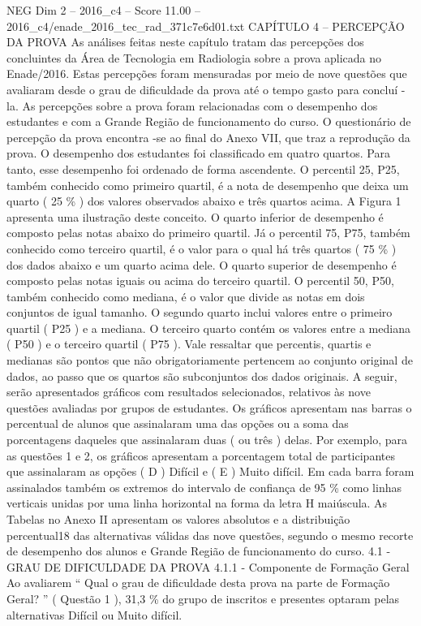 \begin{textsample}{NEG Dim 2 – 2016\_c4 – Score 11.00 – 2016\_c4/enade\_2016\_tec\_rad\_371c7e6d01.txt}  \label{ex:f2_neg_360}
CAPÍTULO 4 – PERCEPÇÃO DA PROVA As análises feitas neste capítulo tratam das percepções dos concluintes da Área de Tecnologia em Radiologia sobre a prova aplicada no Enade/2016.
Estas percepções foram mensuradas por meio de nove questões que avaliaram desde o grau de dificuldade da prova até o tempo gasto para concluí -la.
As percepções sobre a prova foram relacionadas com o desempenho dos estudantes e com a Grande Região de funcionamento do curso.
O questionário de percepção da prova encontra -se ao final do Anexo VII, que traz a reprodução da prova.
O desempenho dos estudantes foi classificado em quatro quartos.
Para tanto, esse desempenho foi ordenado de forma ascendente.
O percentil 25, P25, também conhecido como primeiro quartil, é a nota de desempenho que deixa um quarto ( 25 \% ) dos valores observados abaixo e três quartos acima.
A Figura 1 apresenta uma ilustração deste conceito.
O quarto inferior de desempenho é composto pelas notas abaixo do primeiro quartil.
Já o percentil 75, P75, também conhecido como terceiro quartil, é o valor para o qual há três quartos ( 75 \% ) dos dados abaixo e um quarto acima dele.
O quarto superior de desempenho é composto pelas notas iguais ou acima do terceiro quartil.
O percentil 50, P50, também conhecido como mediana, é o valor que divide as notas em dois conjuntos de igual tamanho.
O segundo quarto inclui valores entre o primeiro quartil ( P25 ) e a mediana.
O terceiro quarto contém os valores entre a mediana ( P50 ) e o terceiro quartil ( P75 ).
Vale ressaltar que percentis, quartis e medianas são pontos que não obrigatoriamente pertencem ao conjunto original de dados, ao passo que os quartos são subconjuntos dos dados originais.
A seguir, serão apresentados gráficos com resultados selecionados, relativos às nove questões avaliadas por grupos de estudantes.
Os gráficos apresentam nas barras o percentual de alunos que assinalaram uma das opções ou a soma das porcentagens daqueles que assinalaram duas ( ou três ) delas.
Por exemplo, para as questões 1 e 2, os gráficos apresentam a porcentagem total de participantes que assinalaram as opções ( D ) Difícil e ( E ) Muito difícil.
Em cada barra foram assinalados também os extremos do intervalo de confiança de 95 \% como linhas verticais unidas por uma linha horizontal na forma da letra H maiúscula.
As Tabelas no Anexo II apresentam os valores absolutos e a distribuição percentual18 das alternativas válidas das nove questões, segundo o mesmo recorte de desempenho dos alunos e Grande Região de funcionamento do curso. 4.1 - GRAU DE DIFICULDADE DA PROVA 4.1.1 - Componente de Formação Geral Ao avaliarem “ Qual o grau de dificuldade desta prova na parte de Formação Geral? ” ( Questão 1 ), 31,3 \% do grupo de inscritos e presentes optaram pelas alternativas Difícil ou Muito difícil.

\end{textsample}

